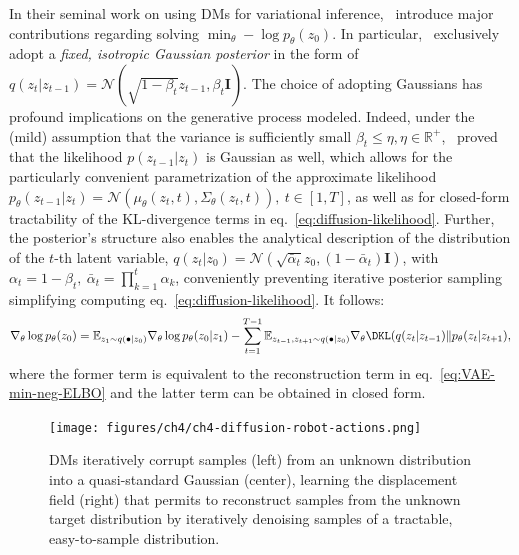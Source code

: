In their seminal work on using DMs for variational inference,~\citet{hoDenoisingDiffusionProbabilistic2020} introduce major contributions regarding solving \( \min_\theta -\log p_\theta(z_0) \).
In particular,~\citet{hoDenoisingDiffusionProbabilistic2020} exclusively adopt a \emph{fixed, isotropic Gaussian posterior} in the form of \( q(z_t \vert z_{t-1}) = \mathcal{N}(\sqrt{1-\beta_t}z_{t-1}, \beta_t \mathbf I) \).
The choice of adopting Gaussians has profound implications on the generative process modeled. 
Indeed, under the (mild) assumption that the variance is sufficiently small \( \beta_t \leq \eta, \eta \in \mathbb R^+ \),~\citet{sohl-dicksteinDeepUnsupervisedLearning2015} proved that the likelihood \( p(z_{t-1} \vert z_t) \) is Gaussian as well, which allows for the particularly convenient parametrization of the approximate likelihood \( p_\theta (z_{t-1} \vert z_t) = \mathcal N(\mu_\theta(z_t, t), \Sigma_\theta(z_t,t)), \ t \in [1,T] \), as well as for closed-form tractability of the KL-divergence terms in eq.~\ref{eq:diffusion-likelihood}.
Further, the posterior's structure also enables the analytical description of the distribution of the \( t\)-th latent variable, \( q(z_t \vert z_0) = \mathcal N (\sqrt{\bar{\alpha}_t}z_0, (1-\bar{\alpha}_t) \mathbf{I}) \), with \( \alpha_t = 1-\beta_t, \ \bar \alpha_t = \prod_{k=1}^t \alpha_k \), conveniently preventing iterative posterior sampling simplifying computing eq.~\ref{eq:diffusion-likelihood}.
It follows:
\begin{align}
    \nabla_\theta \log p_\theta (z_0) = \mathbb E_{z_1 \sim q(\bullet \vert z_0)} \nabla_\theta \log p_\theta (z_0 \vert z_1) - \sum_{t=1}^{T-1} \mathbb E_{z_{t-1}, z_{t+1} \sim q(\bullet \vert z_0)} \nabla_\theta \DKL (q(z_t \vert z_{t-1}) \Vert p_\theta(z_t \vert z_{t+1}), \label{eq:diffusion-likelihood-gradient}
\end{align}
where the former term is equivalent to the reconstruction term in eq.~\ref{eq:VAE-min-neg-ELBO} and the latter term can be obtained in closed form.


\begin{figure}
    \centering
    \texttt{[image: figures/ch4/ch4-diffusion-robot-actions.png]}
    \caption{DMs iteratively corrupt samples (left) from an unknown distribution into a quasi-standard Gaussian (center), learning the displacement field (right) that permits to reconstruct samples from the unknown target distribution by iteratively denoising samples of a tractable, easy-to-sample distribution.}
    \label{fig:diffusion-robot-actions}
\end{figure}

